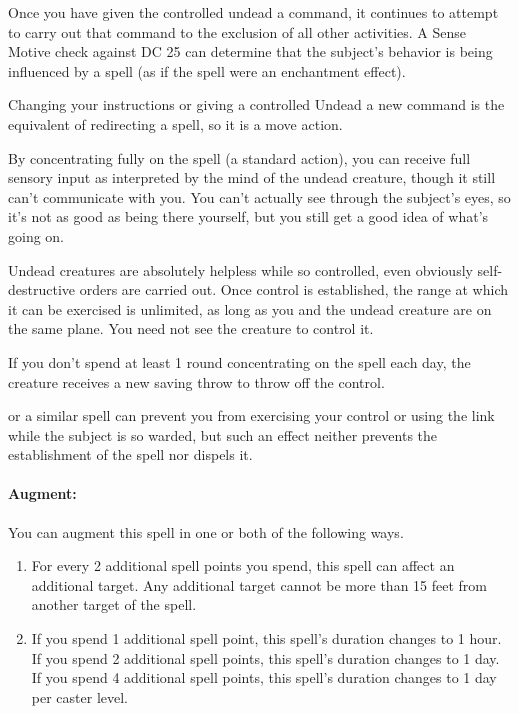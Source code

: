 Once you have given the controlled undead a command, 
it continues to attempt to carry out that command to the exclusion of all other activities. 
A Sense Motive check against DC 25 can determine that the subject's behavior is being influenced by a spell (as if the spell were an enchantment effect).

Changing your instructions or giving a controlled Undead a new command is the equivalent of redirecting a spell, so it is a move action.

By concentrating fully on the spell (a standard action), 
you can receive full sensory input as interpreted by the mind of the undead creature, though it still can't communicate with you. 
You can't actually see through the subject's eyes, so it's not as good as being there yourself, but you still get a good idea of what's going on.

Undead creatures are absolutely helpless while so controlled, even obviously self-destructive orders are carried out. 
Once control is established, the range at which it can be exercised is unlimited, as long as you and the undead creature are on the same plane. 
You need not see the creature to control it.

If you don't spend at least 1 round concentrating on the spell each day, the creature receives a new saving throw to throw off the control.

 or a similar spell can prevent you from exercising your control or using the link while the subject is so warded, 
but such an effect neither prevents the establishment of the spell nor dispels it.

\paragraph{Augment:} You can augment this spell in one or both of the following ways.
\begin{enumerate}
 \item For every 2 additional spell points you spend, this spell can affect an additional target. 
 Any additional target cannot be more than 15 feet from another target of the spell.
 \item If you spend 1 additional spell point, this spell's duration changes to 1 hour.
 If you spend 2 additional spell points, this spell's duration changes to 1 day. 
 If you spend 4 additional spell points, this spell's duration changes to 1 day per caster level.
\end{enumerate}
